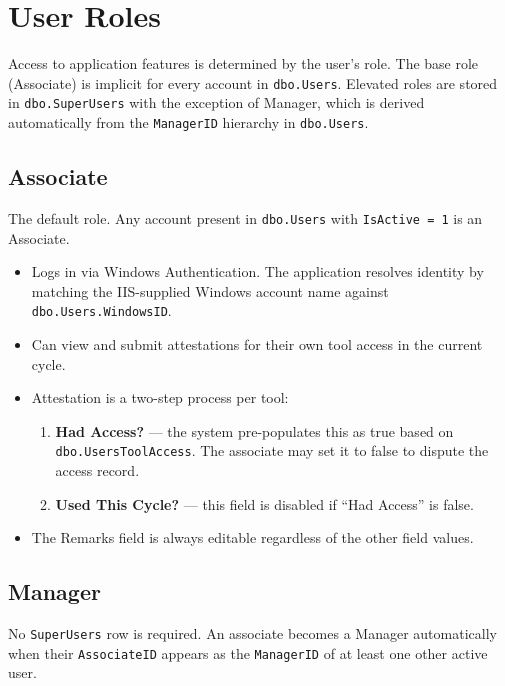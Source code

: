 \documentclass[12pt,a4paper]{report}
\begin{document}
\chapter{User Roles}

Access to application features is determined by the user's role. The base role (Associate) is
implicit for every account in \texttt{dbo.Users}. Elevated roles are stored in
\texttt{dbo.SuperUsers} with the exception of Manager, which is derived automatically from the
\texttt{ManagerID} hierarchy in \texttt{dbo.Users}.

\section{Associate}

The default role. Any account present in \texttt{dbo.Users} with \texttt{IsActive = 1} is an
Associate.

\begin{itemize}
  \item Logs in via Windows Authentication. The application resolves identity by matching
        the IIS-supplied Windows account name against \texttt{dbo.Users.WindowsID}.
  \item Can view and submit attestations for their own tool access in the current cycle.
  \item Attestation is a two-step process per tool:
  \begin{enumerate}
    \item \textbf{Had Access?} — the system pre-populates this as true based on
          \texttt{dbo.UsersToolAccess}. The associate may set it to false to dispute the
          access record.
    \item \textbf{Used This Cycle?} — this field is disabled if ``Had Access'' is false.
  \end{enumerate}
  \item The Remarks field is always editable regardless of the other field values.
\end{itemize}

\section{Manager}

No \texttt{SuperUsers} row is required. An associate becomes a Manager automatically when their
\texttt{AssociateID} appears as the \texttt{ManagerID} of at least one other active user.
\end{document}
